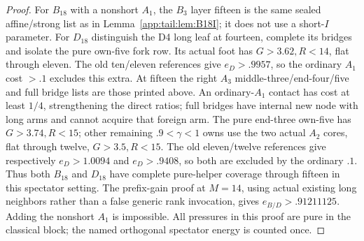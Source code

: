 \documentclass[11pt]{article}
\theoremstyle{definition}
\theoremstyle{remark}
\begin{document}
\begin{proof}
For $B_{18}$ with a nonshort $A_1$, the $B_3$ layer fifteen
is the same sealed affine/strong list as in
Lemma~\ref{app:tail:lem:B18I}; it does not use a short-$I$
parameter. For $D_{18}$ distinguish the D4 long leaf at
fourteen, complete its bridges and isolate the pure own-five
fork row. Its actual foot has $G>3.62,R<14$, flat through
eleven. The old ten/eleven references give $e_D>.9957$,
so the ordinary $A_1$ cost $>.1$ excludes this extra.
At fifteen the right $A_3$ middle-three/end-four/five and
full bridge lists are those printed above. An ordinary-$A_1$
contact has cost at least $1/4$, strengthening the direct
ratios; full bridges have internal new node with long arms
and cannot acquire that foreign arm.
The pure end-three own-five has $G>3.74,R<15$; other
remaining $.9<\gamma<1$ owns use the two actual $A_2$
cores, flat through twelve, $G>3.5,R<15$.
The old eleven/twelve references give respectively $e_D>1.0094$
and $e_D>.9408$, so both are excluded by the ordinary $.1$.
Thus both $B_{18}$ and $D_{18}$ have complete pure-helper
coverage through fifteen in this spectator setting.
The prefix-gain proof at $M=14$, using actual existing long
neighbors rather than a false generic rank invocation, gives
$e_{B/D}>.91211125$. Adding the nonshort $A_1$ is impossible.
All pressures in this proof are pure in the classical block;
the named orthogonal spectator energy is counted once.
\end{proof}
\end{document}
